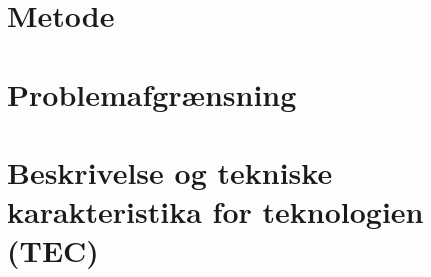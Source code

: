 

\raggedbottom



\frontmatter
%
%
%
%
%
%

\tableofcontents* 

\mainmatter

%
%
%
%
%
%
\chapter{Metode}\vspace{-.75cm}

\chapter{Problemafgrænsning}\vspace{-.75cm}

\chapter{Beskrivelse og tekniske karakteristika for teknologien (TEC)}\vspace{-.75cm} \label{TEC_chap}

